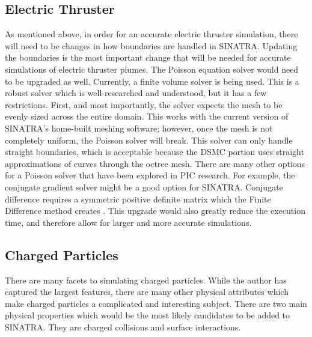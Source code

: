 \subsection{Electric Thruster}

As mentioned above, in order for an accurate electric thruster simulation, there will need to be changes in how boundaries are handled in SINATRA. Updating the boundaries is the most important change that will be needed for accurate simulations of electric thruster plumes. The Poisson equation solver would need to be upgraded as well. Currently, a finite volume solver is being used. This is a robust solver which is well-researched and understood, but it has a few restrictions. First, and most importantly, the solver expects the mesh to be evenly sized across the entire domain. This works with the current version of SINATRA's home-built meshing software; however, once the mesh is not completely uniform, the Poisson solver will break. This solver can only handle straight boundaries, which is acceptable because the DSMC portion uses straight approximations of curves through the octree mesh. There are many other options for a Poisson solver that have been explored in PIC research. For example, the conjugate gradient solver might be a good option for SINATRA. Conjugate difference requires a symmetric positive definite matrix which the Finite Difference method creates \cite{FD_GS}. This upgrade would also greatly reduce the execution time, and therefore allow for larger and more accurate simulations. \par

\subsection{Charged Particles}

There are many facets to simulating charged particles. While the author has captured the largest features, there are many other physical attributes which make charged particles a complicated and interesting subject. There are two main physical properties which would be the most likely candidates to be added to SINATRA. They are charged collisions and surface interactions. \par

